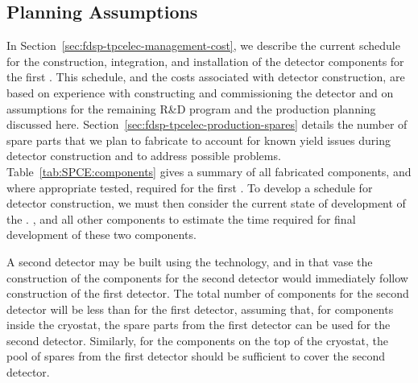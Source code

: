 \subsection{Planning Assumptions}
\label{sec:fdsp-tpcelec-management-planning}

In Section~\ref{sec:fdsp-tpcelec-management-cost}, we describe
the current schedule for the construction, integration, and installation
of the  detector components for the first   . This schedule, and the costs associated
with detector construction, are based on experience with constructing and commissioning the 
detector and on assumptions for the remaining R\&D program
and the production planning discussed here. 
Section~\ref{sec:fdsp-tpcelec-production-spares} details
the number of spare parts that we plan to fabricate to
account for known yield issues during detector construction
and to address possible problems. Table~\ref{tab:SPCE:components}
gives a summary of all fabricated components, and where
appropriate tested, required for the first 
 . To develop a schedule for detector construction, 
we must then consider the current state of development of 
the . , and all other components to 
estimate the time required for final development of these
two components.

A second detector may be built using the  technology, 
and in that vase the construction of the  components 
for the second detector would immediately follow construction of 
the first detector. The total number of components for the second 
detector will be less than for the first detector, assuming that, 
for components inside the cryostat, the spare parts from the first 
detector can be used for the second detector. Similarly, for the 
components on the top of the cryostat, the
pool of spares from the first detector should be sufficient to cover
the second detector.


